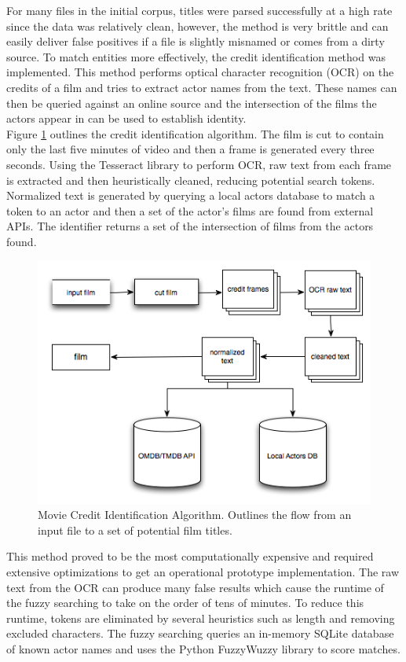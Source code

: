 \documentclass[paper=a4, fontsize=11pt]{scrartcl} %
\numberwithin{equation}{section} %
\numberwithin{figure}{section} %
\numberwithin{table}{section} %
\begin{document}
For many files in the initial corpus, titles were parsed successfully at a high rate since the data was relatively clean, however, the method is very brittle and can easily deliver false positives if a file is slightly misnamed or comes from a dirty source. To match entities more effectively, the credit identification method was implemented. This method performs optical character recognition (OCR) on the credits of a film and tries to extract actor names from the text. These names can then be queried against an online source and the intersection of the films the actors appear in can be used to establish identity. \\

Figure \ref{fig:credit-identifier} outlines the credit identification algorithm. The film is cut to contain only the last five minutes of video and then a frame is generated every three seconds. Using the Tesseract library to perform OCR, raw text from each frame is extracted and then heuristically cleaned, reducing potential search tokens. Normalized text is generated by querying a local actors database to match a token to an actor and then a set of the actor's films are found from external APIs. The identifier returns a set of the intersection of films from the actors found. \\


\begin{figure}[H]
\center\includegraphics[scale=0.80]{credit-identifier.png}
\caption{Movie Credit Identification Algorithm. Outlines the flow from an input file to a set of potential film titles.}
\label{fig:credit-identifier}
\end{figure}


This method proved to be the most computationally expensive and required extensive optimizations to get an operational prototype implementation. The raw text from the OCR can produce many false results which cause the runtime of the fuzzy searching to take on the order of tens of minutes. To reduce this runtime, tokens are eliminated by several heuristics such as length and removing excluded characters. The fuzzy searching queries an in-memory SQLite database of known actor names and uses the Python FuzzyWuzzy library to score matches. \\
\end{document}

